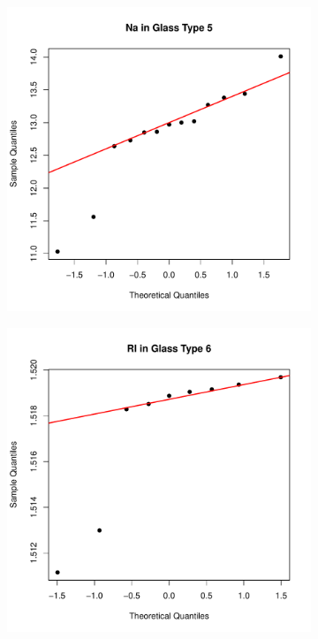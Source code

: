 \documentclass[a4paper, 12pt, titlepage, headsepline, listof = totoc, bibliography = totoc, numbers = noenddot]{scrartcl}
\begin{document}

\begin{figure}[h!]
\centering
\begin{subfigure}{.5\textwidth}
  \centering
  \includegraphics[width=\linewidth]{report-QQsampleslin2a}
  \vspace{-1cm}
  \caption{}
  \label{fig:QQsampleslin2a}
\end{subfigure}%
\begin{subfigure}{.5\textwidth}
  \centering
  \includegraphics[width=\linewidth]{report-QQsampleslin2b}

\end{subfigure}
\end{figure}
\end{document}
